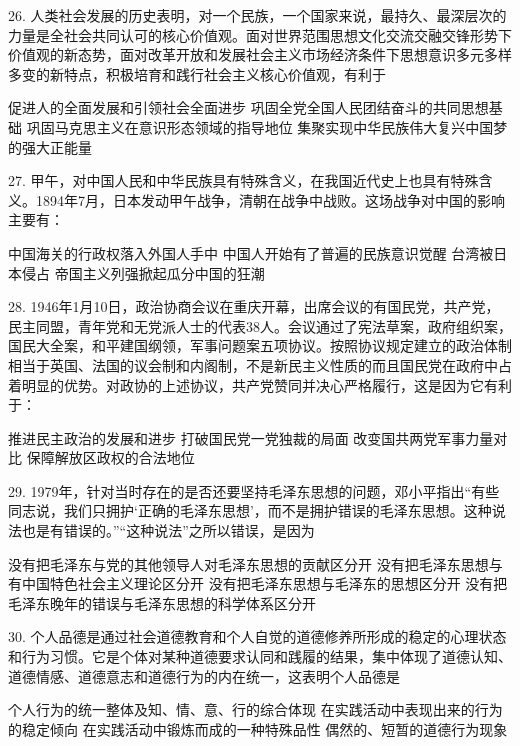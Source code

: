 26. 人类社会发展的历史表明，对一个民族，一个国家来说，最持久、最深层次的力量是全社会共同认可的核心价值观。面对世界范围思想文化交流交融交锋形势下价值观的新态势，面对改革开放和发展社会主义市场经济条件下思想意识多元多样多变的新特点，积极培育和践行社会主义核心价值观，有利于
\begin{choices}
	 促进人的全面发展和引领社会全面进步
	 巩固全党全国人民团结奋斗的共同思想基础
	 巩固马克思主义在意识形态领域的指导地位
	 集聚实现中华民族伟大复兴中国梦的强大正能量
\end{choices}
27. 甲午，对中国人民和中华民族具有特殊含义，在我国近代史上也具有特殊含义。1894年7月，日本发动甲午战争，清朝在战争中战败。这场战争对中国的影响主要有：
\begin{choices}
	 中国海关的行政权落入外国人手中
	 中国人开始有了普遍的民族意识觉醒
	 台湾被日本侵占
	 帝国主义列强掀起瓜分中国的狂潮
\end{choices}
28. 1946年1月10日，政治协商会议在重庆开幕，出席会议的有国民党，共产党，民主同盟，青年党和无党派人士的代表38人。会议通过了宪法草案，政府组织案，国民大全案，和平建国纲领，军事问题案五项协议。按照协议规定建立的政治体制相当于英国、法国的议会制和内阁制，不是新民主义性质的而且国民党在政府中占着明显的优势。对政协的上述协议，共产党赞同并决心严格履行，这是因为它有利于：
\begin{choices}
	 推进民主政治的发展和进步
	 打破国民党一党独裁的局面
	 改变国共两党军事力量对比
	 保障解放区政权的合法地位
\end{choices}
29. 1979年，针对当时存在的是否还要坚持毛泽东思想的问题，邓小平指出“有些同志说，我们只拥护‘正确的毛泽东思想’，而不是拥护错误的毛泽东思想。这种说法也是有错误的。”“这种说法”之所以错误，是因为
\begin{choices}
	 没有把毛泽东与党的其他领导人对毛泽东思想的贡献区分开
	 没有把毛泽东思想与有中国特色社会主义理论区分开
	 没有把毛泽东思想与毛泽东的思想区分开
	 没有把毛泽东晚年的错误与毛泽东思想的科学体系区分开
\end{choices}
30. 个人品德是通过社会道德教育和个人自觉的道德修养所形成的稳定的心理状态和行为习惯。它是个体对某种道德要求认同和践履的结果，集中体现了道德认知、道德情感、道德意志和道德行为的内在统一，这表明个人品德是
\begin{choices}
	 个人行为的统一整体及知、情、意、行的综合体现
	 在实践活动中表现出来的行为的稳定倾向
	 在实践活动中锻炼而成的一种特殊品性
	 偶然的、短暂的道德行为现象
\end{choices}
